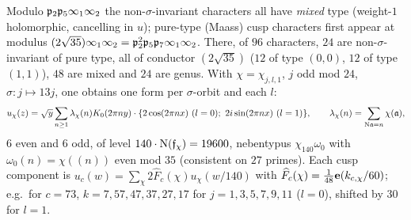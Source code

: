 Modulo $\mathfrak{p}_2\mathfrak{p}_5\infty_1\infty_2$ the non-$\sigma$-invariant characters all have \emph{mixed} type (weight-$1$ holomorphic, cancelling in $u$); pure-type
(Maass) cusp characters first appear at modulus $(2\sqrt{35})\infty_1\infty_2=\mathfrak{p}_2^2\mathfrak{p}_5\mathfrak{p}_7\infty_1\infty_2$. There, of $96$
characters, $24$ are non-$\sigma$-invariant of pure type, all of conductor $(2\sqrt{35})$ ($12$ of type $(0,0)$, $12$ of type $(1,1)$), $48$ are mixed and
$24$ are genus. With $\chi=\chi_{j,l,1}$, $j$ odd mod $24$, $\sigma: j\mapsto13j$, one obtains one form per $\sigma$-orbit and each $l$:
\[
u_\chi(z)=\sqrt y\sum_{n\ge1}\lambda_\chi(n)K_0(2\pi ny)\cdot\{2\cos(2\pi nx)\ (l=0);\ 2i\sin(2\pi nx)\ (l=1)\},\qquad
\lambda_\chi(n)=\sum_{\Nm\fa=n}\chi(\fa),
\]
$6$ even and $6$ odd, of level $140\cdot\mathrm{N}(\mathfrak{f}_\chi)=19600$, nebentypus $\chi_{140}\omega_0$ with $\omega_0(n)=\chi((n))$ even mod $35$ (consistent on
$27$ primes). Each cusp component is $u_c(w)=\sum_\chi2\widehat F_c(\chi)u_\chi(w/140)$ with $\widehat F_c(\chi)=\tfrac1{48}\mathbf{e}(k_{c,\chi}/60)$; e.g.\ for
$c=73$, $k=7,57,47,37,27,17$ for $j=1,3,5,7,9,11$ ($l=0$), shifted by $30$ for $l=1$.

